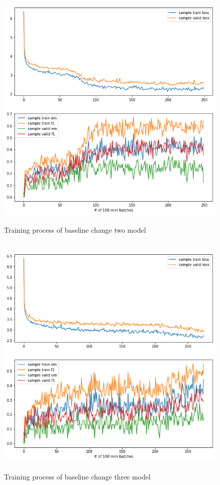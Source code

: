 \documentclass[modernstyle,12pt]{sjsuthesis}
\theoremstyle{definition}
\begin{document}
\begin{figure}[htbp]\centering
  \includegraphics[width=12cm, height=12cm]{figures/match_change2.png}
  \caption{Training process of baseline change two model}
  \label{f:baseline_change2}
\end{figure}

\begin{figure}[htbp]\centering
  \includegraphics[width=12cm, height=12cm]{figures/match_change3.png}
  \caption{Training process of baseline change three model}
  \label{f:baseline_change3}
\end{figure}
\end{document}
